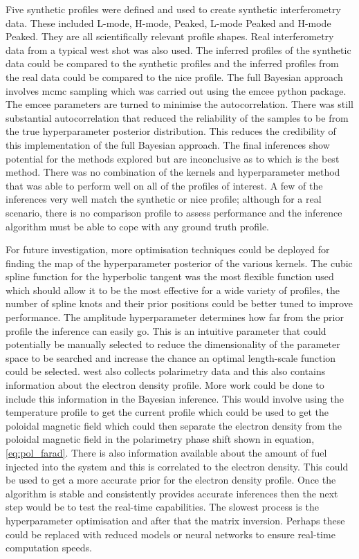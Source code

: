 Five synthetic profiles were defined and used to create synthetic interferometry data. These included L-mode, H-mode, Peaked, L-mode Peaked and H-mode Peaked. They are all scientifically relevant profile shapes. Real interferometry data from a typical \gls{west} shot was also used. The inferred profiles of the synthetic data could be compared to the synthetic profiles and the inferred profiles from the real data could be compared to the \gls{nice} profile. The full Bayesian approach involves \gls{mcmc} sampling which was carried out using the emcee python package. The emcee parameters are turned to minimise the autocorrelation. There was still substantial autocorrelation that reduced the reliability of the samples to be from the true hyperparameter posterior distribution. This reduces the credibility of this implementation of the full Bayesian approach. The final inferences show potential for the methods explored but are inconclusive as to which is the best method. There was no combination of the kernels and hyperparameter method that was able to perform well on all of the profiles of interest. A few of the inferences very well match the synthetic or \gls{nice} profile; although for a real scenario, there is no comparison profile to assess performance and the inference algorithm must be able to cope with any ground truth profile.

For future investigation, more optimisation techniques could be deployed for finding the \gls{map} of the hyperparameter posterior of the various kernels. The cubic spline function for the hyperbolic tangent was the most flexible function used which should allow it to be the most effective for a wide variety of profiles, the number of spline knots and their prior positions could be better tuned to improve performance. The amplitude hyperparameter determines how far from the prior profile the inference can easily go. This is an intuitive parameter that could potentially be manually selected to reduce the dimensionality of the parameter space to be searched and increase the chance an optimal length-scale function could be selected. \gls{west} also collects polarimetry data and this also contains information about the electron density profile. More work could be done to include this information in the Bayesian inference. This would involve using the temperature profile to get the current profile which could be used to get the poloidal magnetic field which could then separate the electron density from the poloidal magnetic field in the polarimetry phase shift shown in equation, \ref{eq:pol_farad}. There is also information available about the amount of fuel injected into the system and this is correlated to the electron density. This could be used to get a more accurate prior for the electron density profile. Once the algorithm is stable and consistently provides accurate inferences then the next step would be to test the real-time capabilities. The slowest process is the hyperparameter optimisation and after that the matrix inversion. Perhaps these could be replaced with reduced models or neural networks to ensure real-time computation speeds.

